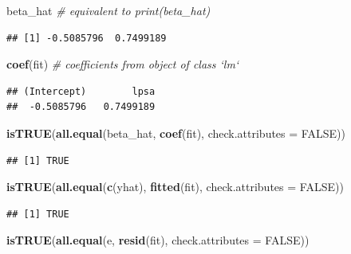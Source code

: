 \documentclass[]{book}
\newenvironment{Shaded}{\begin{snugshade}}{\end{snugshade}}
\newcommand{\KeywordTok}[1]{\textcolor[rgb]{0.13,0.29,0.53}{\textbf{#1}}}
\newcommand{\DataTypeTok}[1]{\textcolor[rgb]{0.13,0.29,0.53}{#1}}
\newcommand{\CommentTok}[1]{\textcolor[rgb]{0.56,0.35,0.01}{\textit{#1}}}
\newcommand{\OtherTok}[1]{\textcolor[rgb]{0.56,0.35,0.01}{#1}}
\newcommand{\NormalTok}[1]{#1}
\theoremstyle{definition}
\theoremstyle{definition}
\theoremstyle{definition}
\theoremstyle{remark}
\begin{document}
\begin{Shaded}
\begin{Highlighting}[]
\NormalTok{beta_hat }\CommentTok{# equivalent to print(beta_hat)}
\end{Highlighting}
\end{Shaded}

\begin{verbatim}
## [1] -0.5085796  0.7499189
\end{verbatim}

\begin{Shaded}
\begin{Highlighting}[]
\KeywordTok{coef}\NormalTok{(fit) }\CommentTok{# coefficients from object of class `lm`}
\end{Highlighting}
\end{Shaded}

\begin{verbatim}
## (Intercept)        lpsa 
##  -0.5085796   0.7499189
\end{verbatim}

\begin{Shaded}
\begin{Highlighting}[]
\KeywordTok{isTRUE}\NormalTok{(}\KeywordTok{all.equal}\NormalTok{(beta_hat, }\KeywordTok{coef}\NormalTok{(fit), }\DataTypeTok{check.attributes =} \OtherTok{FALSE}\NormalTok{))}
\end{Highlighting}
\end{Shaded}

\begin{verbatim}
## [1] TRUE
\end{verbatim}

\begin{Shaded}
\begin{Highlighting}[]
\KeywordTok{isTRUE}\NormalTok{(}\KeywordTok{all.equal}\NormalTok{(}\KeywordTok{c}\NormalTok{(yhat), }\KeywordTok{fitted}\NormalTok{(fit), }\DataTypeTok{check.attributes =} \OtherTok{FALSE}\NormalTok{))}
\end{Highlighting}
\end{Shaded}

\begin{verbatim}
## [1] TRUE
\end{verbatim}

\begin{Shaded}
\begin{Highlighting}[]
\KeywordTok{isTRUE}\NormalTok{(}\KeywordTok{all.equal}\NormalTok{(e, }\KeywordTok{resid}\NormalTok{(fit), }\DataTypeTok{check.attributes =} \OtherTok{FALSE}\NormalTok{))}
\end{Highlighting}
\end{Shaded}
\end{document}
